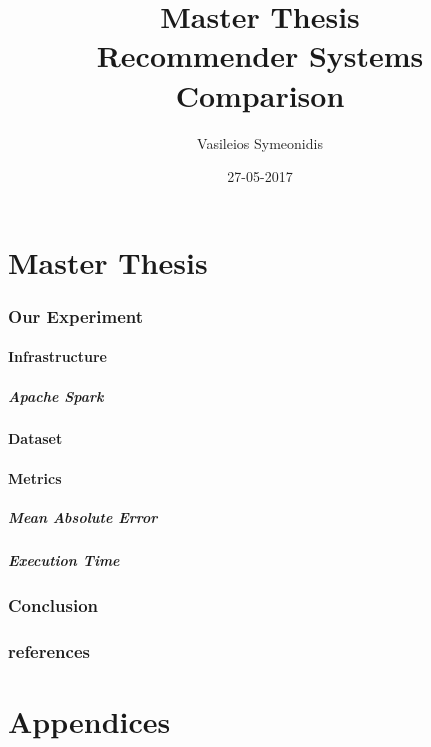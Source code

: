 \documentclass{article}
\title{Master Thesis \\ Recommender Systems Comparison}
\date{27-05-2017}
\author{Vasileios Symeonidis}
\begin{document}
\maketitle
\newpage
\tableofcontents
{}
\newpage
{}

\part{Master Thesis}


\section{Our Experiment}
\subsection{Infrastructure}
\subsubsection{Apache Spark}
\subsection{Dataset}
\subsection{Metrics}
\subsubsection{Mean Absolute Error}
\subsubsection{Execution Time}
\cite{ApacheSpark:1}
\cite{RecommenderSystems:2}
\cite{MovieLens:3}



\section{Conclusion}
\section{references}

\newpage
\appendix
\part{Appendices}
\end{document}
